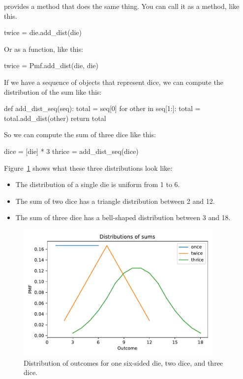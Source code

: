 \documentclass[12pt]{book}
\theoremstyle{exercise}
\begin{document}
 provides a method that does the same thing.
You can call it as a method, like this.

\begin{code}
twice = die.add_dist(die)
\end{code}

Or as a function, like this:

\begin{code}
twice = Pmf.add_dist(die, die)
\end{code}

If we have a sequence of  objects that represent dice, we can compute the distribution of the sum like this:

\begin{code}
def add_dist_seq(seq):
    total = seq[0]
    for other in seq[1:]:
        total = total.add_dist(other)
    return total
\end{code}

So we can compute the sum of three dice like this:

\begin{code}
dice = [die] * 3
thrice = add_dist_seq(dice)
\end{code}

Figure~\ref{fig05-01} shows what these three distributions look like:

\begin{itemize}

\item The distribution of a single die is uniform from 1 to 6.

\item The sum of two dice has a triangle distribution between 2 and 12.

\item The sum of three dice has a bell-shaped distribution between 3 and 18.

\end{itemize}

\begin{figure}
\centerline{\includegraphics[width=4in]{figs/fig05-01.pdf}}
\caption{Distribution of outcomes for one six-sided die, two dice, and three dice.}
\label{fig05-01}
\end{figure}
\end{document}
